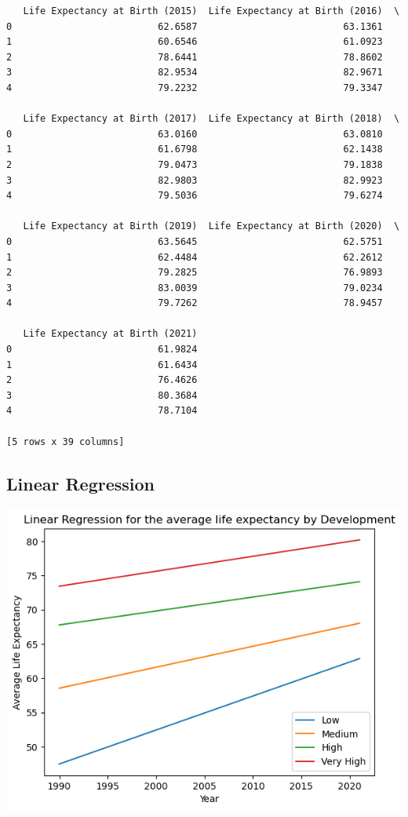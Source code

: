 \documentclass{article}
\begin{document}
\begin{verbatim}
   Life Expectancy at Birth (2015)  Life Expectancy at Birth (2016)  \
0                          62.6587                          63.1361   
1                          60.6546                          61.0923   
2                          78.6441                          78.8602   
3                          82.9534                          82.9671   
4                          79.2232                          79.3347   

   Life Expectancy at Birth (2017)  Life Expectancy at Birth (2018)  \
0                          63.0160                          63.0810   
1                          61.6798                          62.1438   
2                          79.0473                          79.1838   
3                          82.9803                          82.9923   
4                          79.5036                          79.6274   

   Life Expectancy at Birth (2019)  Life Expectancy at Birth (2020)  \
0                          63.5645                          62.5751   
1                          62.4484                          62.2612   
2                          79.2825                          76.9893   
3                          83.0039                          79.0234   
4                          79.7262                          78.9457   

   Life Expectancy at Birth (2021)  
0                          61.9824  
1                          61.6434  
2                          76.4626  
3                          80.3684  
4                          78.7104  

[5 rows x 39 columns]
\end{verbatim}

\subsection{Linear Regression}

\includegraphics[width=0.7\linewidth]{files/2696926812c48737a0885ddaedea1dbc.png}
\end{document}

